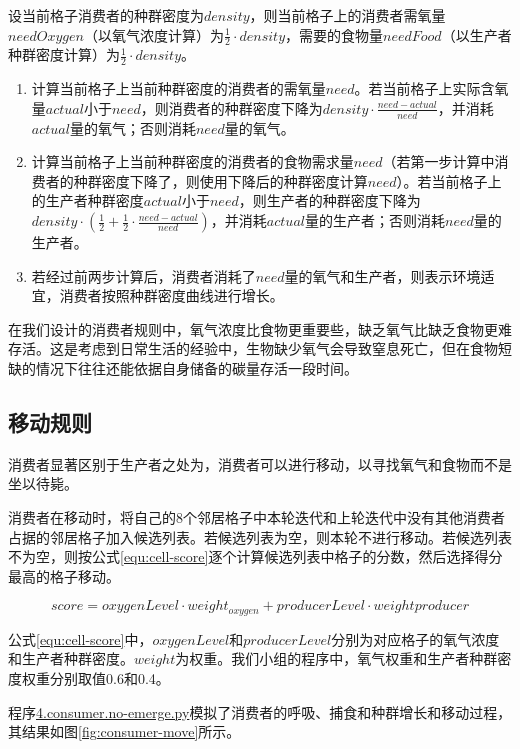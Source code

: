 \documentclass{ctexart}
\begin{document}
设当前格子消费者的种群密度为$density$，则当前格子上的消费者需氧量$needOxygen$（以氧气浓度计算）为$\frac {1}{2} \cdot density$，需要的食物量$needFood$（以生产者种群密度计算）为$\frac {1}{2} \cdot density$。

\begin{enumerate}
  \item 计算当前格子上当前种群密度的消费者的需氧量$need$。若当前格子上实际含氧量$actual$小于$need$，则消费者的种群密度下降为$density \cdot \frac{need - actual}{need}$，并消耗$actual$量的氧气；否则消耗$need$量的氧气。
  \item 计算当前格子上当前种群密度的消费者的食物需求量$need$（若第一步计算中消费者的种群密度下降了，则使用下降后的种群密度计算$need$）。若当前格子上的生产者种群密度$actual$小于$need$，则生产者的种群密度下降为$density \cdot (\frac{1}{2} + \frac{1}{2} \cdot \frac{need - actual}{need})$，并消耗$actual$量的生产者；否则消耗$need$量的生产者。
  \item 若经过前两步计算后，消费者消耗了$need$量的氧气和生产者，则表示环境适宜，消费者按照种群密度曲线进行增长。
\end{enumerate}

在我们设计的消费者规则中，氧气浓度比食物更重要些，缺乏氧气比缺乏食物更难存活。这是考虑到日常生活的经验中，生物缺少氧气会导致窒息死亡，但在食物短缺的情况下往往还能依据自身储备的碳量存活一段时间。

\subsection{移动规则}

消费者显著区别于生产者之处为，消费者可以进行移动，以寻找氧气和食物而不是坐以待毙。

消费者在移动时，将自己的8个邻居格子中本轮迭代和上轮迭代中没有其他消费者占据的邻居格子加入候选列表。若候选列表为空，则本轮不进行移动。若候选列表不为空，则按公式\ref{equ:cell-score}逐个计算候选列表中格子的分数，然后选择得分最高的格子移动。

\begin{equation}
  \label{equ:cell-score}
  score = oxygenLevel \cdot weight_{oxygen} + producerLevel \cdot weight{producer}
\end{equation}

公式\ref{equ:cell-score}中，$oxygenLevel$和$producerLevel$分别为对应格子的氧气浓度和生产者种群密度。$weight$为权重。我们小组的程序中，氧气权重和生产者种群密度权重分别取值0.6和0.4。

程序\underline{4.consumer.no-emerge.py}模拟了消费者的呼吸、捕食和种群增长和移动过程，其结果如图\ref{fig:consumer-move}所示。
\end{document}
